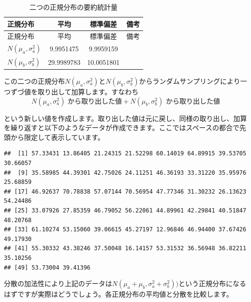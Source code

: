 \documentclass[]{tufte-handout}
\newenvironment{Shaded}{}{}
\newcommand{\AttributeTok}[1]{\textcolor[rgb]{0.49,0.56,0.16}{#1}}
\newcommand{\ConstantTok}[1]{\textcolor[rgb]{0.53,0.00,0.00}{#1}}
\newcommand{\DecValTok}[1]{\textcolor[rgb]{0.25,0.63,0.44}{#1}}
\newcommand{\FunctionTok}[1]{\textcolor[rgb]{0.02,0.16,0.49}{#1}}
\newcommand{\NormalTok}[1]{#1}
\newcommand{\OtherTok}[1]{\textcolor[rgb]{0.00,0.44,0.13}{#1}}
\newcommand{\SpecialCharTok}[1]{\textcolor[rgb]{0.25,0.44,0.63}{#1}}
\begin{document}
\begin{longtable}[]{@{}lccl@{}}
\caption{二つの正規分布の要約統計量}\tabularnewline
\toprule
正規分布 & 平均 & 標準偏差 & 備考 \\
\midrule
\endfirsthead
\toprule
正規分布 & 平均 & 標準偏差 & 備考 \\
\midrule
\endhead
\(N(\mu_a, \sigma^2_a)\) & 9.9951475 & 9.9959159 & \\
\(N(\mu_b, \sigma^2_b)\) & 29.9989783 & 10.0051801 & \\
\bottomrule
\end{longtable}

この二つの正規分布\(N(\mu_a, \sigma^2_a)\)と\(N(\mu_b,\sigma^2_b)\)からランダムサンプリングにより一つずづ値を取り出して加算します。すなわち
　
\[N(\mu_a, \sigma^2_a)\mbox{ から取り出した値} + N(\mu_b,\sigma^2_b)\mbox{ から取り出した値}\]

という新しい値を作成します。取り出した値は元に戻し、同様の取り出し、加算を繰り返すと以下のようなデータが作成できます。ここではスペースの都合で先頭から限定して表示しています。

\begin{Shaded}
\end{Shaded}

\begin{verbatim}
##  [1] 57.33431 13.86405 21.24315 21.52298 60.14019 64.89915 39.53705 30.66057
##  [9] 35.58985 44.39301 42.75026 24.11251 46.36193 33.31220 35.95976 25.68859
## [17] 46.92637 70.78838 57.07144 70.56954 47.77346 31.30232 26.13623 54.24486
## [25] 33.07926 27.85359 46.79052 56.22061 44.89961 42.29841 40.51847 48.20768
## [33] 61.10274 53.15060 39.06615 45.27197 12.96846 46.94400 37.67426 49.17930
## [41] 55.30332 43.38246 37.50048 16.14157 53.31532 36.56948 36.82211 35.10256
## [49] 53.73004 39.41396
\end{verbatim}

分散の加法性により上記のデータは\(N(\mu_a + \mu_b, \sigma^2_a + \sigma^2_b))\)という正規分布になるはずですが実際はどうでしょう。各正規分布の平均値と分散を比較します。
\end{document}
